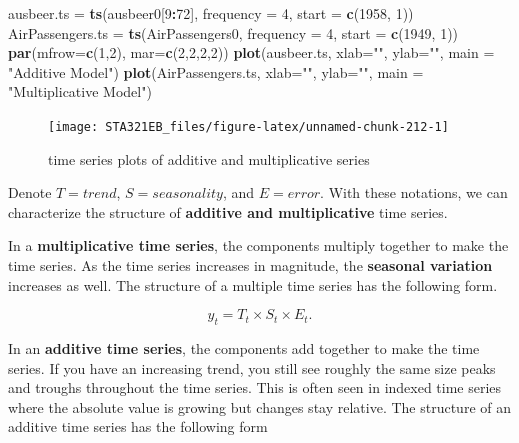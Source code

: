 \documentclass[
]{book}
\newenvironment{Shaded}{\begin{snugshade}}{\end{snugshade}}
\newcommand{\AttributeTok}[1]{\textcolor[rgb]{0.13,0.29,0.53}{#1}}
\newcommand{\DecValTok}[1]{\textcolor[rgb]{0.00,0.00,0.81}{#1}}
\newcommand{\FunctionTok}[1]{\textcolor[rgb]{0.13,0.29,0.53}{\textbf{#1}}}
\newcommand{\NormalTok}[1]{#1}
\newcommand{\OtherTok}[1]{\textcolor[rgb]{0.56,0.35,0.01}{#1}}
\newcommand{\SpecialCharTok}[1]{\textcolor[rgb]{0.81,0.36,0.00}{\textbf{#1}}}
\newcommand{\StringTok}[1]{\textcolor[rgb]{0.31,0.60,0.02}{#1}}
\begin{document}
\begin{Shaded}
\begin{Highlighting}[]
\NormalTok{ausbeer.ts }\OtherTok{=} \FunctionTok{ts}\NormalTok{(ausbeer0[}\DecValTok{9}\SpecialCharTok{:}\DecValTok{72}\NormalTok{], }\AttributeTok{frequency =} \DecValTok{4}\NormalTok{, }\AttributeTok{start =} \FunctionTok{c}\NormalTok{(}\DecValTok{1958}\NormalTok{, }\DecValTok{1}\NormalTok{))}
\NormalTok{AirPassengers.ts }\OtherTok{=} \FunctionTok{ts}\NormalTok{(AirPassengers0, }\AttributeTok{frequency =} \DecValTok{4}\NormalTok{, }\AttributeTok{start =} \FunctionTok{c}\NormalTok{(}\DecValTok{1949}\NormalTok{, }\DecValTok{1}\NormalTok{))}
\FunctionTok{par}\NormalTok{(}\AttributeTok{mfrow=}\FunctionTok{c}\NormalTok{(}\DecValTok{1}\NormalTok{,}\DecValTok{2}\NormalTok{), }\AttributeTok{mar=}\FunctionTok{c}\NormalTok{(}\DecValTok{2}\NormalTok{,}\DecValTok{2}\NormalTok{,}\DecValTok{2}\NormalTok{,}\DecValTok{2}\NormalTok{))}
\FunctionTok{plot}\NormalTok{(ausbeer.ts, }\AttributeTok{xlab=}\StringTok{""}\NormalTok{, }\AttributeTok{ylab=}\StringTok{""}\NormalTok{, }\AttributeTok{main =} \StringTok{"Additive Model"}\NormalTok{)}
\FunctionTok{plot}\NormalTok{(AirPassengers.ts, }\AttributeTok{xlab=}\StringTok{""}\NormalTok{, }\AttributeTok{ylab=}\StringTok{""}\NormalTok{, }\AttributeTok{main =} \StringTok{"Multiplicative Model"}\NormalTok{)}
\end{Highlighting}
\end{Shaded}

\begin{figure}

{\centering \texttt{[image: STA321EB\_files/figure-latex/unnamed-chunk-212-1]} 

}

\caption{time series plots of additive and multiplicative series}\label{fig:unnamed-chunk-212}
\end{figure}

Denote \(T = trend\), \(S = seasonality\), and \(E = error\). With these notations, we can characterize the structure of \textbf{additive and multiplicative} time series.

In a \textbf{multiplicative time series}, the components multiply together to make the time series. As the time series increases in magnitude, the \textbf{seasonal variation} increases as well. The structure of a multiple time series has the following form.

\[
y_t = T_t \times S_t \times E_t.
\]

In an \textbf{additive time series}, the components add together to make the time series. If you have an increasing trend, you still see roughly the same size peaks and troughs throughout the time series. This is often seen in indexed time series where the absolute value is growing but changes stay relative. The structure of an additive time series has the following form
\end{document}
